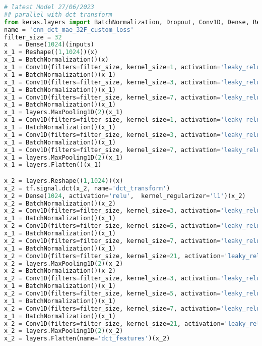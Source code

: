 \begin{lstlisting}[language=Python]
# latest Model 27/06/2023
## parallel with dct transform
from keras.layers import BatchNormalization, Dropout, Conv1D, Dense, Reshape
name = 'cnn_dct_mae_32F_custom_loss'
filter_size = 32
x   = Dense(1024)(inputs)
x_1 = Reshape((1,1024))(x)
x_1 = BatchNormalization()(x)
x_1 = Conv1D(filters=filter_size, kernel_size=1, activation='leaky_relu',data_format='channels_first')(x_1)
x_1 = BatchNormalization()(x_1)
x_1 = Conv1D(filters=filter_size, kernel_size=3, activation='leaky_relu',data_format='channels_first')(x_1)
x_1 = BatchNormalization()(x_1)
x_1 = Conv1D(filters=filter_size, kernel_size=7, activation='leaky_relu',data_format='channels_first')(x_1)
x_1 = BatchNormalization()(x_1)
x_1 = layers.MaxPooling1D(2)(x_1)
x_1 = Conv1D(filters=filter_size, kernel_size=1, activation='leaky_relu',data_format='channels_first')(x_1)
x_1 = BatchNormalization()(x_1)
x_1 = Conv1D(filters=filter_size, kernel_size=3, activation='leaky_relu',data_format='channels_first')(x_1)
x_1 = BatchNormalization()(x_1)
x_1 = Conv1D(filters=filter_size, kernel_size=7, activation='leaky_relu',data_format='channels_first')(x_1)
x_1 = layers.MaxPooling1D(2)(x_1)
x_1 = layers.Flatten()(x_1)

x_2 = layers.Reshape((1,1024))(x)
x_2 = tf.signal.dct(x_2, name='dct_transform')
x_2 = Dense(1024, activation='relu',  kernel_regularizer='l1')(x_2)
x_2 = BatchNormalization()(x_2)
x_2 = Conv1D(filters=filter_size, kernel_size=3, activation='leaky_relu',data_format='channels_first')(x_2)
x_1 = BatchNormalization()(x_1)
x_2 = Conv1D(filters=filter_size, kernel_size=5, activation='leaky_relu',data_format='channels_first')(x_2)
x_1 = BatchNormalization()(x_1)
x_2 = Conv1D(filters=filter_size, kernel_size=7, activation='leaky_relu',data_format='channels_first')(x_2)
x_1 = BatchNormalization()(x_1)
x_2 = Conv1D(filters=filter_size, kernel_size=21, activation='leaky_relu',data_format='channels_first')(x_2)
x_2 = layers.MaxPooling1D(2)(x_2)
x_2 = BatchNormalization()(x_2)
x_2 = Conv1D(filters=filter_size, kernel_size=3, activation='leaky_relu',data_format='channels_first')(x_2)
x_1 = BatchNormalization()(x_1)
x_2 = Conv1D(filters=filter_size, kernel_size=5, activation='leaky_relu',data_format='channels_first')(x_2)
x_1 = BatchNormalization()(x_1)
x_2 = Conv1D(filters=filter_size, kernel_size=7, activation='leaky_relu',data_format='channels_first')(x_2)
x_1 = BatchNormalization()(x_1)
x_2 = Conv1D(filters=filter_size, kernel_size=21, activation='leaky_relu',data_format='channels_first')(x_2)
x_2 = layers.MaxPooling1D(2)(x_2)
x_2 = layers.Flatten(name='dct_features')(x_2)


\end{lstlisting}
